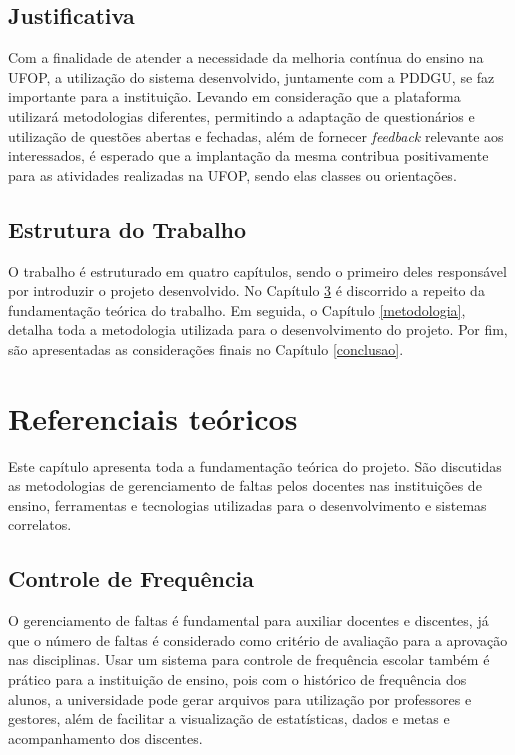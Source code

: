 \documentclass[
  12pt,       %
  openright,      %
  oneside,      %
  a4paper,      %
  english,      %
  french,        %
  spanish,     %
  brazil        %
  ]{abntex2-decsi}
\begin{document}
    \section{Justificativa}

        Com a finalidade de atender a necessidade da melhoria contínua do ensino na UFOP, a utilização do sistema desenvolvido, juntamente com a PDDGU, se faz importante para a instituição. Levando em consideração que a plataforma utilizará metodologias diferentes, permitindo a adaptação de questionários e utilização de questões abertas e fechadas, além de fornecer \textit{feedback} relevante aos interessados, é esperado que a implantação da mesma contribua positivamente para as atividades realizadas na UFOP, sendo elas classes ou orientações.

    \section{Estrutura do Trabalho}

        O trabalho é estruturado em quatro capítulos, sendo o primeiro deles responsável por introduzir o projeto desenvolvido. No Capítulo \ref{ref_teoricos} é discorrido a repeito da fundamentação teórica do trabalho. Em seguida, o Capítulo \ref{metodologia}, detalha toda a metodologia utilizada para o desenvolvimento do projeto. Por fim, são apresentadas as considerações finais no Capítulo \ref{conclusao}.

\chapter{Referenciais teóricos}\label{ref_teoricos}

	Este capítulo apresenta toda a fundamentação teórica do projeto. São discutidas as metodologias de gerenciamento de faltas pelos docentes nas instituições de ensino, ferramentas e tecnologias utilizadas para o desenvolvimento e sistemas correlatos.

    \section{Controle de Frequência}

        O gerenciamento de faltas é fundamental para auxiliar docentes e discentes, já que o número de faltas é considerado como critério de avaliação para a aprovação nas disciplinas. Usar um sistema para controle de frequência escolar também é prático para a instituição de ensino, pois com o histórico de frequência dos alunos, a universidade pode gerar arquivos para utilização por professores e gestores, além de facilitar a visualização de estatísticas, dados e metas e acompanhamento dos discentes.
               
\end{document}
